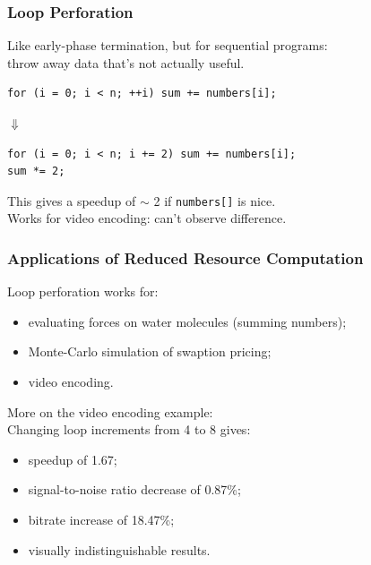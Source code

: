 
\begin{frame}[fragile]
  \frametitle{Loop Perforation}


  Like early-phase termination, but for sequential programs:\\
  \qquad throw away data that's not actually useful.

  \begin{lstlisting}
for (i = 0; i < n; ++i) sum += numbers[i];
  \end{lstlisting}

  \begin{center}
    $\Downarrow$
  \end{center}

  \begin{lstlisting}
for (i = 0; i < n; i += 2) sum += numbers[i];
sum *= 2;
  \end{lstlisting}

  This gives a speedup of $\sim$ 2 if {\tt numbers[]} is nice.\\[1em]

  Works for video encoding: can't observe difference.



\end{frame}

\begin{frame}
  \frametitle{Applications of Reduced Resource Computation}


  Loop perforation works for:
  \begin{itemize}
   \item evaluating forces on water molecules (summing numbers);
   \item Monte-Carlo simulation of swaption pricing;
   \item video encoding.
  \end{itemize}

  More on the video encoding example:\\
  Changing loop increments from 4 to 8 gives:
\begin{itemize}
 \item speedup of 1.67;
 \item signal-to-noise ratio decrease of 0.87\%;
 \item bitrate increase of 18.47\%;
 \item visually indistinguishable results.
\end{itemize}

\end{frame}

